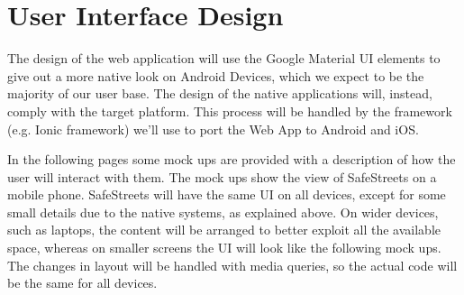 \section{User Interface Design}

The design of the web application will use the Google Material UI elements to give out a more native look on
Android Devices, which we expect to be the majority of our user base.
The design of the native applications will, instead, comply with the target platform. This process will be handled
by the framework (e.g. Ionic framework) we'll use to port the Web App to Android and iOS.

In the following pages some mock ups are provided with a description of how the user will interact with them.
The mock ups show the view of SafeStreets on a mobile phone. 
SafeStreets will have the same UI on all devices, except for some small details due to the native systems, as explained above. 
On wider devices, such as laptops, the content will be arranged to better exploit all the available space, whereas on smaller screens the UI will look like the following mock ups.
The changes in layout will be handled with media queries, so the actual code will be the same for all devices. 
\newpage








